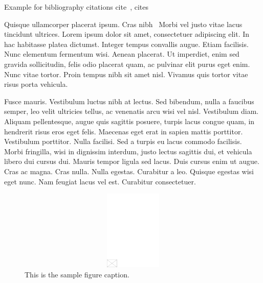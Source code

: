 \documentclass[APA,LATO1COL]{WileyNJD-v2}
\begin{document}
Example for bibliography citations cite~\citep{Elbaum2002}, cites~\cite{Allen2011,Yoo2007}

Quisque ullamcorper placerat ipsum. Cras nibh~\cite{Yoo2007,Schulz2012} Morbi vel justo vitae lacus tincidunt ultrices. Lorem ipsum dolor sit
amet, consectetuer adipiscing elit. In hac habitasse platea dictumst. Integer tempus convallis augue. Etiam facilisis.
Nunc elementum fermentum wisi. Aenean placerat. Ut imperdiet, enim sed gravida sollicitudin, felis odio placerat
quam, ac pulvinar elit purus eget enim. Nunc vitae tortor. Proin tempus nibh sit amet nisl. Vivamus quis tortor
vitae risus porta vehicula.

Fusce mauris. Vestibulum luctus nibh at lectus. Sed bibendum, nulla a faucibus semper, leo velit ultricies tellus, ac
venenatis arcu wisi vel nisl. Vestibulum diam. Aliquam pellentesque, augue quis sagittis posuere, turpis lacus congue
quam, in hendrerit risus eros eget felis. Maecenas eget erat in sapien mattis porttitor. Vestibulum porttitor. Nulla facilisi. Sed a turpis eu lacus commodo facilisis. Morbi fringilla, wisi in dignissim interdum, justo lectus sagittis dui, et
vehicula libero dui cursus dui. Mauris tempor ligula sed lacus. Duis cursus enim ut augue. Cras ac magna. Cras nulla.
Nulla egestas. Curabitur a leo. Quisque egestas wisi eget nunc. Nam feugiat lacus vel est. Curabitur consectetuer.


\begin{figure}[t]
\centerline{\includegraphics[width=342pt,height=9pc,draft]{empty}}
\caption{This is the sample figure caption.\label{fig1}}
\end{figure}
\end{document}
